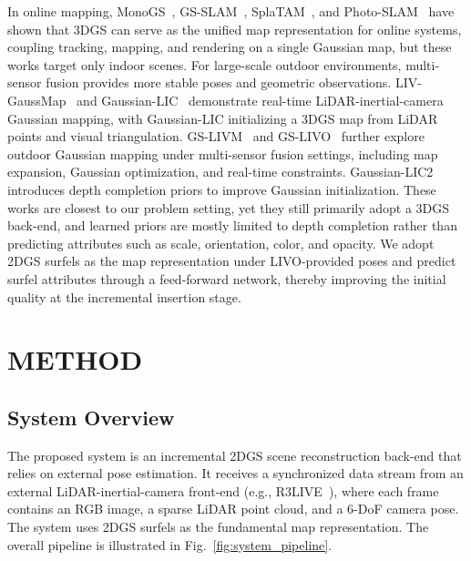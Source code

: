 \documentclass[letterpaper, 10pt, conference]{ieeeconf}
\begin{document}
In online mapping, MonoGS~\cite{matsuki2024gaussian}, GS-SLAM~\cite{yan2024gs}, SplaTAM~\cite{keetha2024splatam}, and Photo-SLAM~\cite{huang2024photo} have shown that 3DGS can serve as the unified map representation for online systems, coupling tracking, mapping, and rendering on a single Gaussian map, but these works target only indoor scenes. For large-scale outdoor environments, multi-sensor fusion provides more stable poses and geometric observations. LIV-GaussMap~\cite{hong2024liv} and Gaussian-LIC~\cite{lang2024gaussian} demonstrate real-time LiDAR-inertial-camera Gaussian mapping, with Gaussian-LIC initializing a 3DGS map from LiDAR points and visual triangulation. GS-LIVM~\cite{xie2024gs} and GS-LIVO~\cite{hong2025gs} further explore outdoor Gaussian mapping under multi-sensor fusion settings, including map expansion, Gaussian optimization, and real-time constraints. Gaussian-LIC2~\cite{lang2025gaussianlic2} introduces depth completion priors to improve Gaussian initialization. These works are closest to our problem setting, yet they still primarily adopt a 3DGS back-end, and learned priors are mostly limited to depth completion rather than predicting attributes such as scale, orientation, color, and opacity. We adopt 2DGS surfels as the map representation under LIVO-provided poses and predict surfel attributes through a feed-forward network, thereby improving the initial quality at the incremental insertion stage.


\section{METHOD}

\subsection{System Overview}

The proposed system is an incremental 2DGS scene reconstruction back-end that relies on external pose estimation. It receives a synchronized data stream from an external LiDAR-inertial-camera front-end (e.g., R3LIVE~\cite{lin2022r}), where each frame contains an RGB image, a sparse LiDAR point cloud, and a 6-DoF camera pose. The system uses 2DGS surfels as the fundamental map representation. The overall pipeline is illustrated in Fig.~\ref{fig:system_pipeline}.
\end{document}
